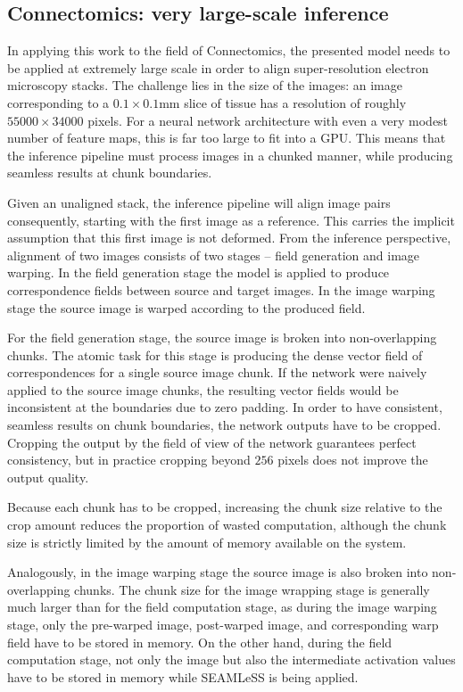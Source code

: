 \documentclass{article}
\begin{document}
\subsection{Connectomics: very large-scale inference}
In applying this work to the field of Connectomics, the presented model needs to be applied at extremely large scale in order to align super-resolution electron microscopy stacks. The challenge lies in the size of the images: an image corresponding to a $0.1\times 0.1$mm slice of tissue has a resolution of roughly $55000\times 34000$ pixels. For a neural network architecture with even a very modest number of feature maps, this is far too large to fit into a GPU. This means that the inference pipeline must process images in a chunked manner, while producing seamless results at chunk boundaries.  

Given an unaligned stack, the inference pipeline will align image pairs consequently, starting with the first image as a reference. This carries the implicit assumption that this first image is not deformed. From the inference perspective, alignment of two images consists of two stages -- field generation and image warping. In the field generation stage the model is applied to produce correspondence fields between source and target images. In the image warping stage the source image is warped according to the produced field. 

For the field generation stage, the source image is broken into non-overlapping chunks. The atomic task for this stage is producing the dense vector field of correspondences for a single source image chunk. If the network were naively applied to the source image chunks, the resulting vector fields would be inconsistent at the boundaries due to zero padding. In order to have consistent, seamless results on chunk boundaries, the network outputs have to be cropped. Cropping the output by the field of view of the network guarantees perfect consistency, but in practice cropping beyond $256$ pixels does not improve the output quality.

Because each chunk has to be cropped, increasing the chunk size relative to the crop amount reduces the proportion of wasted computation, although the chunk size is strictly limited by the amount of memory available on the system.

Analogously, in the image warping stage the source image is also broken into non-overlapping chunks. The chunk size for the image wrapping stage is generally much larger than for the field computation stage, as during the image warping stage, only the pre-warped image, post-warped image, and corresponding warp field have to be stored in memory. On the other hand, during the field computation stage, not only the image but also the intermediate activation values have to be stored in memory while SEAMLeSS is being applied. 
\end{document}
